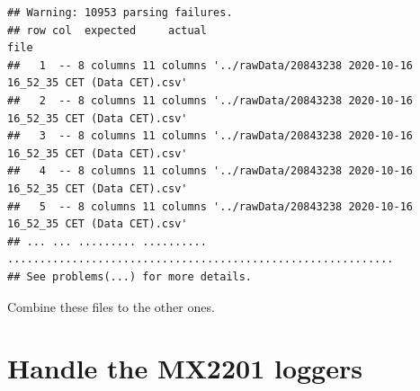 \documentclass[]{article}
\newenvironment{Shaded}{\begin{snugshade}}{\end{snugshade}}
\newcommand{\DecValTok}[1]{\textcolor[rgb]{0.00,0.00,0.81}{#1}}
\newcommand{\KeywordTok}[1]{\textcolor[rgb]{0.13,0.29,0.53}{\textbf{#1}}}
\newcommand{\NormalTok}[1]{#1}
\newcommand{\OperatorTok}[1]{\textcolor[rgb]{0.81,0.36,0.00}{\textbf{#1}}}
\newcommand{\StringTok}[1]{\textcolor[rgb]{0.31,0.60,0.02}{#1}}
\begin{document}
\begin{verbatim}
## Warning: 10953 parsing failures.
## row col  expected     actual                                                         file
##   1  -- 8 columns 11 columns '../rawData/20843238 2020-10-16 16_52_35 CET (Data CET).csv'
##   2  -- 8 columns 11 columns '../rawData/20843238 2020-10-16 16_52_35 CET (Data CET).csv'
##   3  -- 8 columns 11 columns '../rawData/20843238 2020-10-16 16_52_35 CET (Data CET).csv'
##   4  -- 8 columns 11 columns '../rawData/20843238 2020-10-16 16_52_35 CET (Data CET).csv'
##   5  -- 8 columns 11 columns '../rawData/20843238 2020-10-16 16_52_35 CET (Data CET).csv'
## ... ... ......... .......... ............................................................
## See problems(...) for more details.
\end{verbatim}

Combine these files to the other ones.

\begin{Shaded}
\end{Shaded}

\hypertarget{handle-the-mx2201-loggers}{%
\section{Handle the MX2201 loggers}\label{handle-the-mx2201-loggers}}
\end{document}
